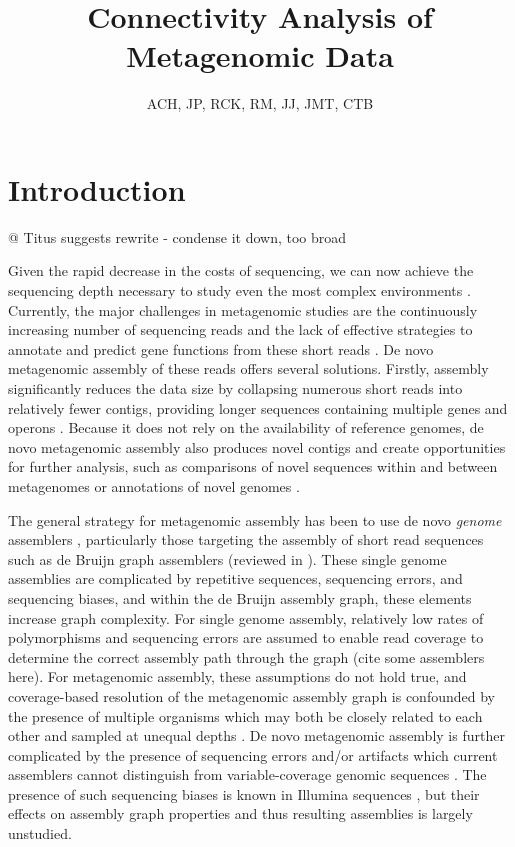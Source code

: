 \documentclass[11pt]{article} %
\begin{document}
\title{Connectivity Analysis of Metagenomic Data}
\author{ACH, JP, RCK, RM, JJ, JMT, CTB}
\maketitle
\section{Introduction}

@ Titus suggests rewrite - condense it down, too broad

Given the rapid decrease in the costs of sequencing, we can now achieve the sequencing depth necessary to study even the most complex environments \cite{Hess:2011p686,Qin:2010p189}.  Currently, the major challenges in metagenomic studies are the continuously increasing number of sequencing reads and the lack of effective strategies to annotate and predict gene functions from these short reads \cite{Hoff:2009p913,Kunin:2008p16,Noguchi:2006p968,Zhang:2012p959}.  De novo metagenomic assembly of these reads offers several solutions.  Firstly, assembly significantly reduces the data size by collapsing numerous short reads into relatively fewer contigs, providing longer sequences containing multiple genes and operons \cite{Miller:2010p226,Pop:2009p798}.  Because it does not rely on the availability of reference genomes, de novo metagenomic assembly also produces novel contigs and create opportunities for further analysis, such as comparisons of novel sequences within and between metagenomes \cite{Li:2009p707,Schloss:2008p2} or annotations of novel genomes \cite{Hess:2011p686}.

The general strategy for metagenomic assembly has been to use de novo \emph{genome} assemblers \cite{Hess:2011p686,Qin:2010p189}, particularly those targeting the assembly of short read sequences such as de Bruijn graph assemblers (reviewed in \cite{Miller:2010p226,Pop:2009p798}). These single genome assemblies are complicated by repetitive sequences, sequencing errors, and sequencing biases, and within the de Bruijn assembly graph, these elements increase graph complexity. For single genome assembly, relatively low rates of polymorphisms and sequencing errors are assumed to enable read coverage to determine the correct assembly path through the graph (cite some assemblers here).  For metagenomic assembly, these assumptions do not hold true, and coverage-based resolution of the metagenomic assembly graph is confounded by the presence of multiple organisms which may both be closely related to each other and sampled at unequal depths \cite{Peng:2011p898}.  De novo metagenomic assembly is further complicated by the presence of sequencing errors and/or artifacts which current assemblers cannot distinguish from variable-coverage genomic sequences \cite{Peng:2011p898,Venter:2004p727}.  The presence of such sequencing biases is known in Illumina sequences \cite{Harismendy:2009p228,Hoffmann:2009p1027,Nakamura:2011p741}, but their effects on assembly graph properties and thus resulting assemblies is largely unstudied. 
  
\end{document}
